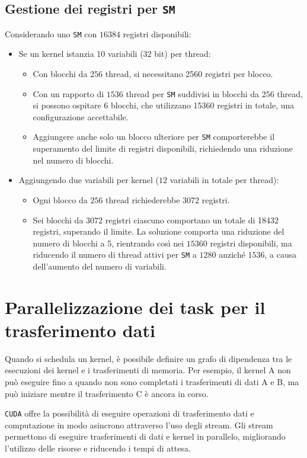 \subsection{Gestione dei registri per \texttt{SM}}
Considerando uno \texttt{SM} con $16384$ registri disponibili:
\begin{itemize}
  \item Se un kernel istanzia 10 variabili ($32$ bit) per thread:
  \begin{itemize}
    \item Con blocchi da $256$ thread, si necessitano 2560 registri per blocco.
    \item Con un rapporto di $1536$ thread per \texttt{SM} suddivisi in blocchi da
    $256$ thread, si possono ospitare $6$ blocchi, che utilizzano 15360 registri in
    totale, una configurazione accettabile.
    \item Aggiungere anche solo un blocco ulteriore per \texttt{SM} comporterebbe
    il superamento del limite di registri disponibili, richiedendo una riduzione
    nel numero di blocchi.
  \end{itemize}
  \item Aggiungendo due variabili per kernel ($12$ variabili in totale per thread):
  \begin{itemize}
    \item Ogni blocco da $256$ thread richiederebbe 3072 registri.
    \item Sei blocchi da $3072$ registri ciascuno comportano un totale di 18432
    registri, superando il limite. La soluzione comporta una riduzione del
    numero di blocchi a 5, rientrando così nei $15360$ registri disponibili,
    ma riducendo il numero di thread attivi per \texttt{SM} a $1280$ anziché $1536$, a
    causa dell'aumento del numero di variabili.
  \end{itemize}
\end{itemize}

\section{Parallelizzazione dei task per il trasferimento dati}
Quando si schedula un kernel, è possibile definire un grafo di dipendenza tra
le esecuzioni dei kernel e i trasferimenti di memoria. Per esempio, il kernel
A non può eseguire
fino a quando non sono completati i trasferimenti di dati A e B, ma può iniziare
mentre il trasferimento C è ancora in corso.

\texttt{CUDA} offre la possibilità di eseguire operazioni di trasferimento dati
e computazione in modo asincrono attraverso l'uso degli stream. Gli stream
permettono di eseguire trasferimenti di dati e kernel in parallelo, migliorando
l'utilizzo delle risorse e riducendo i tempi di attesa.
